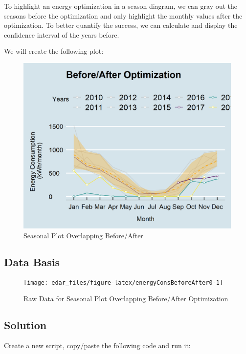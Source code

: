 \documentclass[
  a4paperpaper,
]{book}
\begin{document}
To highlight an energy optimization in a season diagram, we can gray out the seasons before the optimization and only highlight the monthly values after the optimization. To better quantify the success, we can calculate and display the confidence interval of the years before.

We will create the following plot:

\begin{figure}
\includegraphics[width=0.7\linewidth]{images/plotEnergyConsBeforeAfter} \caption{Seasonal Plot Overlapping Before/After}\label{fig:unnamed-chunk-11}
\end{figure}

\hypertarget{data-basis-3}{%
\subsection{Data Basis}\label{data-basis-3}}

\begin{figure}
\texttt{[image: edar\_files/figure-latex/energyConsBeforeAfter0-1]} \caption{Raw Data for Seasonal Plot Overlapping Before/After Optimization}\label{fig:energyConsBeforeAfter0}
\end{figure}

\newpage

\hypertarget{solution-3}{%
\subsection{Solution}\label{solution-3}}

Create a new script, copy/paste the following code and run it:
\end{document}
